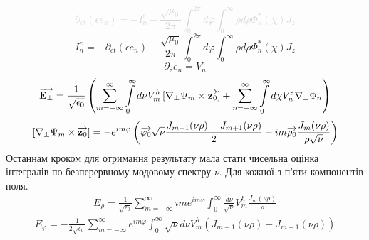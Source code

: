 %
\textcolor{lightgray}{ \begin{equation*}
\partial_{ct} (\epsilon e_n) = - I_n^e - 
\frac{\sqrt{\mu_0}}{2 \pi} \int_0^{2\pi} d \varphi 
\int_0^{\infty} \rho d \rho \Phi_n^* (\chi) J_z
\end{equation*} }
%
\begin{equation*}
I_n^e = - \partial_{ct} (\epsilon e_n) - 
\frac{\sqrt{\mu_0}}{2 \pi} \int_0^{2\pi} d \varphi 
\int_0^{\infty} \rho d \rho \Phi_n^* (\chi) J_z
\end{equation*}
%
\begin{equation*}
\partial_{z} e_n = V_n^e
\end{equation*}
%
\textcolor{lightgray} { \begin{equation*} \begin{aligned}
\overrightarrow{\mathbf E_\perp} = \frac{1}{\sqrt{\epsilon_0}} \left( 
\sum \limits_{m=-\infty}^{\infty} \int \limits_{0}^{\infty} 
d \nu V_m^h \left[  \nabla_\perp \Psi_m  \times  \overrightarrow{\mathbf z_0}  \right] +
\sum \limits_{n=-\infty}^{\infty} \int \limits_{0}^{\infty}
d \chi V_n^e \nabla_\perp \Phi_n \right)
\end{aligned} \end{equation*} }
%
\textcolor{lightgray} { \begin{equation*} \begin{aligned}
\left[  \nabla_\perp \Psi_m  \times  \overrightarrow{\mathbf z_0}  \right] = 
- e^{im\varphi} \left( \overrightarrow{\mathbf \varphi_0} \sqrt{\nu} 
\frac{J_{m-1} (\nu \rho) - J_{m+1} (\nu \rho)}{2} - 
i m \overrightarrow{\mathbf \rho_0} \frac{J_m (\nu \rho)}{ \rho \sqrt{\nu}} \right)
\end{aligned} \end{equation*} }
%
Останнам кроком для отримання результату мала стати чисельна оцінка 
інтегралів по безперервному модовому спектру $ \nu $. Для кожної з п'яти
компонентів поля.
%
\begin{equation*} \begin{aligned} \label{eq:KerrAmendErhoInit}
E_\rho = \frac{1}{\sqrt{\epsilon_0}} \sum_{m=-\infty}^{\infty} 
i m e^{im\varphi} \int_{0}^{\infty} \frac{d \nu}{\sqrt{\nu}} 
V_m^h \frac{J_m(\nu \rho)}{\rho}
\end{aligned} \end{equation*}
%
\begin{equation*} \begin{aligned}
E_\varphi = - \frac{1}{2 \sqrt{\epsilon_0}} \sum_{m=-\infty}^{\infty} 
e^{im\varphi} \int_{0}^{\infty} \sqrt{\nu} d \nu 
V_m^h \left( J_{m-1} (\nu \rho) - J_{m+1} (\nu \rho) \right)
\end{aligned} \end{equation*}
